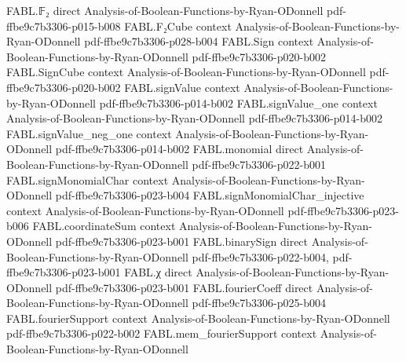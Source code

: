 \begin{theorem}
\label{FABL.RandomizedDecisionTree.symmetryAverage_queryProbability_eq}
\leanok
{}
\proofstep
  {FABL.𝔽₂}
  {direct}
  {Analysis-of-Boolean-Functions-by-Ryan-ODonnell}
  {pdf-ffbe9c7b3306-p015-b008}
\proofstep
  {FABL.F₂Cube}
  {context}
  {Analysis-of-Boolean-Functions-by-Ryan-ODonnell}
  {pdf-ffbe9c7b3306-p028-b004}
\proofstep
  {FABL.Sign}
  {context}
  {Analysis-of-Boolean-Functions-by-Ryan-ODonnell}
  {pdf-ffbe9c7b3306-p020-b002}
\proofstep
  {FABL.SignCube}
  {context}
  {Analysis-of-Boolean-Functions-by-Ryan-ODonnell}
  {pdf-ffbe9c7b3306-p020-b002}
\proofstep
  {FABL.signValue}
  {context}
  {Analysis-of-Boolean-Functions-by-Ryan-ODonnell}
  {pdf-ffbe9c7b3306-p014-b002}
\proofstep
  {FABL.signValue_one}
  {context}
  {Analysis-of-Boolean-Functions-by-Ryan-ODonnell}
  {pdf-ffbe9c7b3306-p014-b002}
\proofstep
  {FABL.signValue_neg_one}
  {context}
  {Analysis-of-Boolean-Functions-by-Ryan-ODonnell}
  {pdf-ffbe9c7b3306-p014-b002}
\proofstep
  {FABL.monomial}
  {direct}
  {Analysis-of-Boolean-Functions-by-Ryan-ODonnell}
  {pdf-ffbe9c7b3306-p022-b001}
\proofstep
  {FABL.signMonomialChar}
  {context}
  {Analysis-of-Boolean-Functions-by-Ryan-ODonnell}
  {pdf-ffbe9c7b3306-p023-b004}
\proofstep
  {FABL.signMonomialChar_injective}
  {context}
  {Analysis-of-Boolean-Functions-by-Ryan-ODonnell}
  {pdf-ffbe9c7b3306-p023-b006}
\proofstep
  {FABL.coordinateSum}
  {context}
  {Analysis-of-Boolean-Functions-by-Ryan-ODonnell}
  {pdf-ffbe9c7b3306-p023-b001}
\proofstep
  {FABL.binarySign}
  {direct}
  {Analysis-of-Boolean-Functions-by-Ryan-ODonnell}
  {pdf-ffbe9c7b3306-p022-b004,
    pdf-ffbe9c7b3306-p023-b001}
\proofstep
  {FABL.χ}
  {direct}
  {Analysis-of-Boolean-Functions-by-Ryan-ODonnell}
  {pdf-ffbe9c7b3306-p023-b001}
\proofstep
  {FABL.fourierCoeff}
  {direct}
  {Analysis-of-Boolean-Functions-by-Ryan-ODonnell}
  {pdf-ffbe9c7b3306-p025-b004}
\proofstep
  {FABL.fourierSupport}
  {context}
  {Analysis-of-Boolean-Functions-by-Ryan-ODonnell}
  {pdf-ffbe9c7b3306-p022-b002}
\proofstep
  {FABL.mem_fourierSupport}
  {context}
  {Analysis-of-Boolean-Functions-by-Ryan-ODonnell}

\end{theorem}
